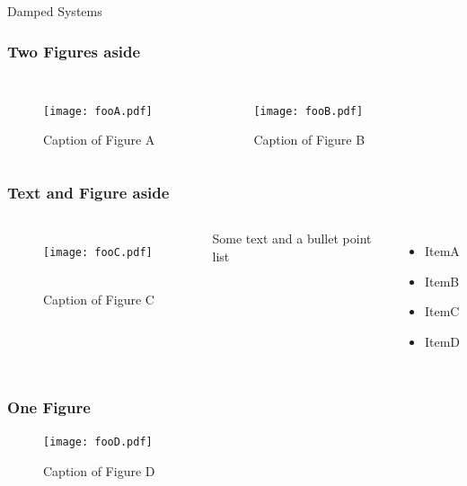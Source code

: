 \documentclass{beamer}
\begin{document}
\begin{frame}{Damped Systems}
	
\end{frame}

	




\begin{frame}
	\frametitle{Two Figures aside}
	\begin{columns}[b]
			\centering
			\begin{figure}
				\texttt{[image: fooA.pdf]} \
				\caption{Caption of Figure A}
			\end{figure}
			\centering
			\begin{figure}
				\texttt{[image: fooB.pdf]} \
				\caption{Caption of Figure B}
			\end{figure}
	\end{columns}
\end{frame}


\begin{frame}
	\frametitle{Text and Figure aside}
	\begin{columns}[]
			\centering
			\begin{figure}
				\texttt{[image: fooC.pdf]} \
				\caption{Caption of Figure C}
			\end{figure}
		\column{0.4875\textwidth}
			Some text and a bullet point list
			\begin{itemize}
				\item ItemA
				\item ItemB
				\item ItemC
				\item ItemD
			\end{itemize}			
	\end{columns}
\end{frame}


\begin{frame}
	\frametitle{One Figure}
	\bigskip
	\begin{figure}
		\texttt{[image: fooD.pdf]}
		\caption{Caption of Figure D}
	\end{figure}
\end{frame}

 
\end{document}
